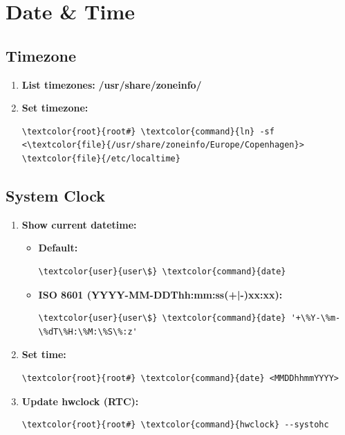 \documentclass[10pt, a4paper, onecolumn, oneside, titlepage, openany]{book}
\begin{document}
\section{Date \& Time}
\subsection{Timezone}
\begin{enumerate}
    \item \textbf{List timezones:}
\newline \textbf{\textcolor{dir}{/usr/share/zoneinfo/}}
    \item \textbf{Set timezone:}
\begin{Verbatim}[commandchars=\\\{\}]
\textcolor{root}{root#} \textcolor{command}{ln} -sf <\textcolor{file}{/usr/share/zoneinfo/Europe/Copenhagen}> \textcolor{file}{/etc/localtime}
\end{Verbatim}
\end{enumerate}
\subsection{System Clock}
\begin{enumerate}
    \item \textbf{Show current datetime:}
    \begin{itemize}
        \item \textbf{Default:}
\begin{Verbatim}[commandchars=\\\{\}]
\textcolor{user}{user\$} \textcolor{command}{date}
\end{Verbatim}
        \item \textbf{ISO 8601 (YYYY-MM-DDThh:mm:ss(+|-)xx:xx):}
\begin{Verbatim}[commandchars=\\\{\}]
\textcolor{user}{user\$} \textcolor{command}{date} '+\%Y-\%m-\%dT\%H:\%M:\%S\%:z'
\end{Verbatim}
    \end{itemize}
    \item \textbf{Set time:}
\begin{Verbatim}[commandchars=\\\{\}]
\textcolor{root}{root#} \textcolor{command}{date} <MMDDhhmmYYYY>
\end{Verbatim}
    \item \textbf{Update hwclock (RTC):}
\begin{Verbatim}[commandchars=\\\{\}]
\textcolor{root}{root#} \textcolor{command}{hwclock} --systohc
\end{Verbatim}
\end{enumerate}
\end{document}
